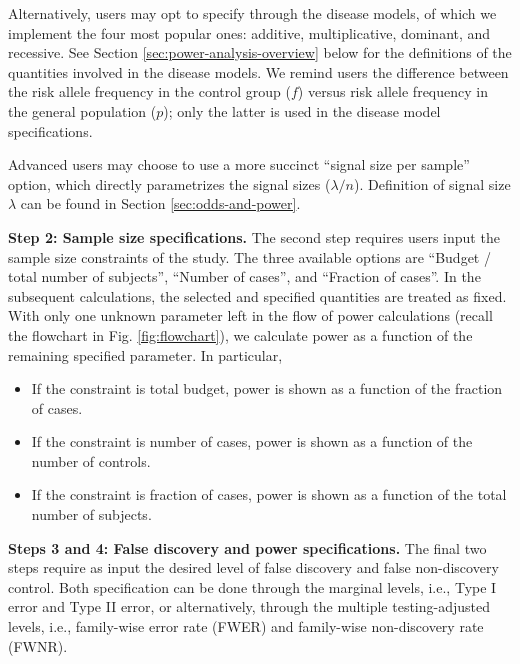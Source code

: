 Alternatively, users may opt to specify through the disease models, of which we implement the four most popular ones: additive, multiplicative, dominant, and recessive.
See Section \ref{sec:power-analysis-overview} below for the definitions of the quantities involved in the disease models.
We remind users the difference between the risk allele frequency in the control group ($f$) versus risk allele frequency in the general population ($p$); only the latter is used in the disease model specifications.

Advanced users may choose to use a more succinct ``signal size per sample'' option, which directly parametrizes the signal sizes ($\lambda/n$).
Definition of signal size $\lambda$ can be found in Section \ref{sec:odds-and-power}.

\bigskip
\noindent
{\bf Step 2: Sample size specifications.}
The second step requires users input the sample size constraints of the study.
The three available options are ``Budget / total number of subjects'', ``Number of cases'', and ``Fraction of cases''.
In the subsequent calculations, the selected and specified quantities are treated as fixed.
With only one unknown parameter left in the flow of power calculations (recall the flowchart in Fig. \ref{fig:flowchart}), we calculate power as a function of the  remaining specified parameter.
In particular,

\begin{itemize}
    \item If the constraint is total budget, power is shown as a function of the fraction of cases.
    \item If the constraint is number of cases, power is shown as a function of the number of controls.
    \item If the constraint is fraction of cases, power is shown as a function of the total number of subjects.
\end{itemize}

\bigskip
\noindent
{\bf Steps 3 and 4: False discovery and power specifications.}
The final two steps require as input the desired level of false discovery and false non-discovery control.
Both specification can be done through the marginal levels, i.e., Type I error and Type II error, or alternatively, through the multiple testing-adjusted levels, i.e., family-wise error rate (FWER) and family-wise non-discovery rate (FWNR).

